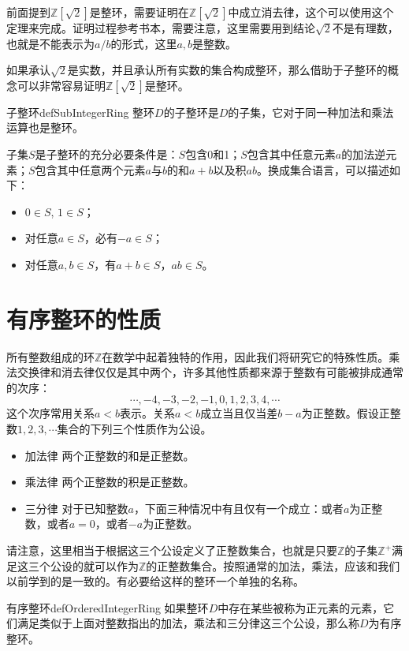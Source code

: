 前面提到$\mathbb{Z}[\sqrt{2}]$是整环，需要证明在$\mathbb{Z}[\sqrt{2}]$中成立消去律，这个可以使用这个定理来完成。证明过程参考书本，需要注意，这里需要用到结论$\sqrt{2}$不是有理数，也就是不能表示为$a/b$的形式，这里$a, b$是整数。

如果承认$\sqrt{2}$是实数，并且承认所有实数的集合构成整环，那么借助于子整环的概念可以非常容易证明$\mathbb{Z}[\sqrt{2}]$是整环。
\begin{definition}{子整环}{defSubIntegerRing}
整环$D$的子整环是$D$的子集，它对于同一种加法和乘法运算也是整环。
\end{definition}

子集$S$是子整环的充分必要条件是：$S$包含0和1；$S$包含其中任意元素$a$的加法逆元素；$S$包含其中任意两个元素$a$与$b$的和$a+b$以及积$ab$。换成集合语言，可以描述如下：
\begin{itemize}
\item $0 \in S$, $1 \in S$；
\item 对任意$a \in S$，必有$-a \in S$；
\item 对任意$a, b \in S$，有$a + b \in S$，$ab \in S$。
\end{itemize}


\section{有序整环的性质}\label{subsection00103}
所有整数组成的环$\mathbb{Z}$在数学中起着独特的作用，因此我们将研究它的特殊性质。乘法交换律和消去律仅仅是其中两个，许多其他性质都来源于整数有可能被排成通常的次序：
\[
\cdots,-4,-3,-2,-1,0,1,2,3,4,\cdots
\]
这个次序常用关系$a<b$表示。关系$a<b$成立当且仅当差$b-a$为正整数。假设正整数$1,2,3,\cdots$集合的下列三个性质作为公设。
\begin{itemize}
\item 加法律 两个正整数的和是正整数。
\item 乘法律 两个正整数的积是正整数。
\item 三分律 对于已知整数$a$，下面三种情况中有且仅有一个成立：或者$a$为正整数，或者$a=0$，或者$-a$为正整数。
\end{itemize}

请注意，这里相当于根据这三个公设定义了正整数集合，也就是只要$\mathbb{Z}$的子集$\mathbb{Z}^+$满足这三个公设的就可以作为$\mathbb{Z}$的正整数集合。按照通常的加法，乘法，应该和我们以前学到的是一致的。有必要给这样的整环一个单独的名称。

\begin{definition}{有序整环}{defOrderedIntegerRing}
如果整环$D$中存在某些被称为正元素的元素，它们满足类似于上面对整数指出的加法，乘法和三分律这三个公设，那么称$D$为有序整环。
\end{definition}

